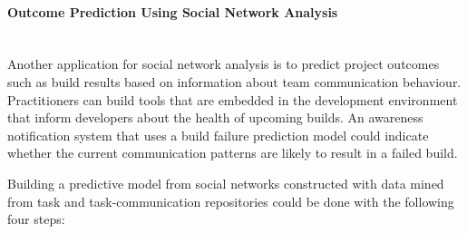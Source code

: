 
\paragraph{Outcome Prediction Using Social Network Analysis}
\ \\
Another application for social network analysis is to predict project outcomes
such as build results based on information about team communication behaviour.
Practitioners can build tools that are embedded in the development environment
that inform developers about the health of upcoming builds. An awareness
notification system that uses a build failure prediction model could indicate
whether the current communication patterns are likely to result in a failed build. 

Building a predictive model from social networks constructed with data mined
from task and task-communication repositories could be done with the following
four steps:






